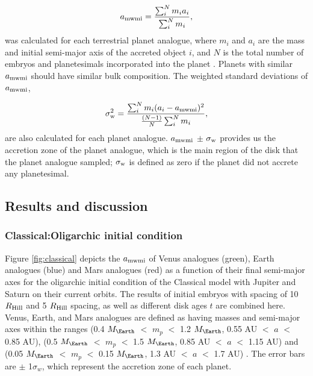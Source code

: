\documentclass{aa}
\begin{document}
\begin{equation}
a_{\rm mwmi} = {\sum_i^N m_i a_i \over \sum_i^N m_i}  
\label{eq:a_mwmi}  
,\end{equation} 
was calculated for each terrestrial planet analogue, where $m_i$ and $a_i$ are the mass and initial semi-major axis of the accreted object $i$, and $N$ is the total number of embryos and planetesimals incorporated into the planet \citep{kaib2015feeding,brasser2017cool,fischer2018radial}. Planets with similar $a_{\rm mwmi}$ should have similar bulk composition. The weighted standard deviations of $a_{\rm mwmi}$,

\begin{equation}
\sigma_{\rm w}^2 = {{\sum_i^N m_i (a_i - a_{\rm mwmi})^2} \over {{(N-1) \over N} \sum_i^N m_i}}
\label{eq:sigma_w},
\end{equation}
are also calculated for each planet analogue. $a_{\rm mwmi}$ $\pm$ $\sigma_{\rm w}$ provides us the accretion zone of the planet analogue, which is the main region of the disk that the planet analogue sampled; $\sigma_{\rm w}$ is defined as zero if the planet did not accrete any planetesimal. 

\subsection{Results and discussion}
\label{subsec:results}
\subsubsection{Classical:Oligarchic initial condition}
\label{subsubsec:classical}
Figure \ref{fig:classical} depicts the $a_{\rm mwmi}$ of Venus analogues (green), Earth analogues (blue) and Mars analogues (red) as a function of their final semi-major axes for the oligarchic initial condition of the Classical model with Jupiter and Saturn on their current orbits. The results of initial embryos with spacing of 10 $R_{\rm Hill}$ and 5 $R_{\rm Hill}$ spacing, as well as different disk ages $t$ are combined here. Venus, Earth, and Mars analogues are defined as having masses and semi-major axes within the ranges (0.4 $M_{\Earth}$ $<$ $m_p$ $<$ 1.2 $M_{\Earth}$, 0.55 AU $<$ $a$ $<$ 0.85 AU), (0.5 $M_{\Earth}$ $<$ $m_p$ $<$ 1.5 $M_{\Earth}$, 0.85 AU $<$ $a$ $<$ 1.15 AU) and (0.05 $M_{\Earth}$ $<$ $m_p$ $<$ 0.15 $M_{\Earth}$, 1.3 AU $<$ $a$ $<$ 1.7 AU) \citep{brasser2016analysis}. The error bars are $\pm$ 1$\sigma_w$, which represent the accretion zone of each planet.
\end{document}
